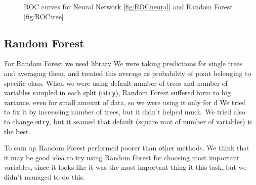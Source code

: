 \documentclass[]{article}
\begin{document}
  \begin{figure}[h]
    \center
    \caption{ROC curves for Neural Network \ref{fig:ROCneural} and Random Forest \ref{fig:ROCtree}}
  \end{figure}

\subsection{Random Forest}

For Random Forest we used library %
We were taking predictions for single trees and averaging them, and treated this average as probability of point belonging to specific class.  
When we were using default number of trees and number of variables sampled in each split (\verb+mtry+), Random Forest suffered form to big variance, even for small amount of data, so we were using it only for d We tried to fix it by increasing number of trees, but it didn't helped much.
We tried also to change \verb+mtry+, but it seamed that default (square root of number of variables) is the best. 

To sum up Random Forest performed poorer than other methods.
We think that it may be good idea to try using Random Forest for choosing most important variables, since it looks like it was the most important thing it this task, but we didn't managed to do this.
\end{document}
